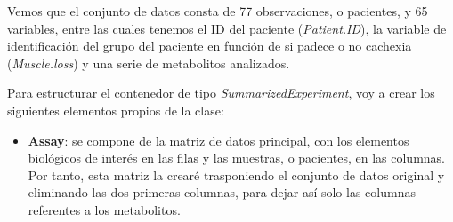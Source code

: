 \documentclass[
]{article}
\newenvironment{Shaded}{\begin{snugshade}}{\end{snugshade}}
\newcommand{\CommentTok}[1]{\textcolor[rgb]{0.56,0.35,0.01}{\textit{#1}}}
\newcommand{\DecValTok}[1]{\textcolor[rgb]{0.00,0.00,0.81}{#1}}
\newcommand{\FunctionTok}[1]{\textcolor[rgb]{0.13,0.29,0.53}{\textbf{#1}}}
\newcommand{\NormalTok}[1]{#1}
\newcommand{\OtherTok}[1]{\textcolor[rgb]{0.56,0.35,0.01}{#1}}
\newcommand{\SpecialCharTok}[1]{\textcolor[rgb]{0.81,0.36,0.00}{\textbf{#1}}}
\providecommand{\tightlist}{%
  \setlength{\itemsep}{0pt}\setlength{\parskip}{0pt}}
\begin{document}
Vemos que el conjunto de datos consta de 77 observaciones, o pacientes,
y 65 variables, entre las cuales tenemos el ID del paciente
(\emph{Patient.ID}), la variable de identificación del grupo del
paciente en función de si padece o no cachexia (\emph{Muscle.loss}) y
una serie de metabolitos analizados.

Para estructurar el contenedor de tipo \emph{SummarizedExperiment}, voy
a crear los siguientes elementos propios de la clase:

\begin{itemize}
\tightlist
\item
  \textbf{Assay}: se compone de la matriz de datos principal, con los
  elementos biológicos de interés en las filas y las muestras, o
  pacientes, en las columnas. Por tanto, esta matriz la crearé
  trasponiendo el conjunto de datos original y eliminando las dos
  primeras columnas, para dejar así solo las columnas referentes a los
  metabolitos.
\end{itemize}

\begin{Shaded}
\end{Shaded}
\end{document}
